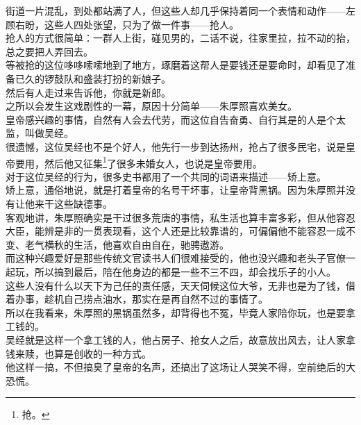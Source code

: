 \begin{multicols}{\theparacolNo}
街道一片混乱，到处都站满了人，但这些人却几乎保持着同一个表情和动作——左顾右盼，这些人四处张望，只为了做一件事——抢人。\\

抢人的方式很简单：一群人上街，碰见男的，二话不说，往家里拉，拉不动的抬，总之要把人弄回去。\\

等被抢的这位哆哆嗦嗦地到了地方，琢磨着这帮人是要钱还是要命时，却看见了准备已久的锣鼓队和盛装打扮的新娘子。\\

然后有人走过来告诉他，你就是新郎。\\

之所以会发生这戏剧性的一幕，原因十分简单——朱厚照喜欢美女。\\

皇帝感兴趣的事情，自然有人会去代劳，而这位自告奋勇、自行其是的人是个太监，叫做吴经。\\

很遗憾，这位吴经也不是个好人，他先行一步到达扬州，抢占了很多民宅，说是皇帝要用，然后他又征集\footnote{抢。}了很多未婚女人，也说是皇帝要用。\\

对于这位吴经的行为，很多史书都用了一个共同的词语来描述——矫上意。\\

矫上意，通俗地说，就是打着皇帝的名号干坏事，让皇帝背黑锅。因为朱厚照并没有让他来干这些缺德事。\\

客观地讲，朱厚照确实是干过很多荒唐的事情，私生活也算丰富多彩，但从他容忍大臣，能辨是非的一贯表现看，这个人还是比较靠谱的，可偏偏他不能容忍一成不变、老气横秋的生活，他喜欢自由自在，驰骋遨游。\\

而这种兴趣爱好是那些传统文官读书人们很难接受的，他也没兴趣和老头子官僚一起玩，所以搞到最后，陪在他身边的都是一些不三不四，却会找乐子的小人。\\

这些人没有什么以天下为己任的责任感，天天伺候这位大爷，无非也是为了钱，借着办事，趁机自己捞点油水，那实在是再自然不过的事情了。\\

所以在我看来，朱厚照的黑锅虽然多，却背得也不冤，毕竟人家陪你玩，也是要拿工钱的。\\

吴经就是这样一个拿工钱的人，他占房子、抢女人之后，故意放出风去，让人家拿钱来赎，也算是创收的一种方式。\\

他这样一搞，不但搞臭了皇帝的名声，还搞出了这场让人哭笑不得，空前绝后的大恐慌。\\


\end{multicols}
